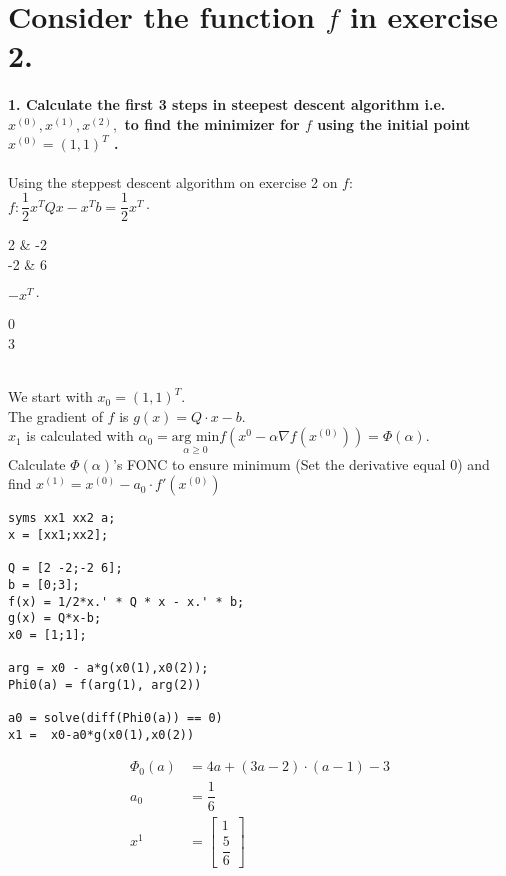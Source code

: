 \documentclass[Main]{subfiles}
\begin{document}
\section*{Consider the function $f$ in exercise 2.}

\paragraph{1. Calculate the first 3 steps in steepest descent algorithm i.e. $x^{(0)}, x^{(1)}, x^{(2)}, $ to find the minimizer for $f$ using the initial point $x^{(0)} = (1,1)^T$ .}	 

Using the steppest descent algorithm on exercise 2 on $f$:
\\
$f: \dfrac{1}{2}x^T Qx - x^Tb = \dfrac{1}{2}x^T \cdot$ 
\begin{ArgMat}
2 & -2 \\
-2 & 6
\end{ArgMat}
$-x^T \cdot$
\begin{ArgMat}
0 \\
3
\end{ArgMat}
\\
We start with $x_0 = (1,1)^T$.
\\
The gradient of $f$ is $g(x) = Q \cdot x - b$.
\\
$x_1$ is calculated with
$\alpha_0 = \underset{\alpha \geq 0}{\text{arg min}} f(x^0 - \alpha \nabla f(x^{(0)})) = \Phi(\alpha)$.
\\
Calculate $\Phi(\alpha)$'s FONC to ensure minimum (Set the derivative equal 0) and find $x^{(1)} = x^{(0)}-a_0 \cdot f'(x^{(0)})$

\begin{lstlisting}[caption=Calculate $x^{(1)}$, style=Code-Matlab, label=lst:CH4-1]
syms xx1 xx2 a;
x = [xx1;xx2];

Q = [2 -2;-2 6];
b = [0;3];
f(x) = 1/2*x.' * Q * x - x.' * b;
g(x) = Q*x-b;
x0 = [1;1];

arg = x0 - a*g(x0(1),x0(2));
Phi0(a) = f(arg(1), arg(2))

a0 = solve(diff(Phi0(a)) == 0)
x1 =  x0-a0*g(x0(1),x0(2))
\end{lstlisting}

\begin{align*}
\Phi_0(a) &= 4a + (3a-2) \cdot (a-1)-3\\
a_0 &= \dfrac{1}{6} \\
x^1 &= \begin{bmatrix}
1 \\[0.3em] 
\dfrac{5}{6} 
\end{bmatrix}
\end{align*}
\end{document}
